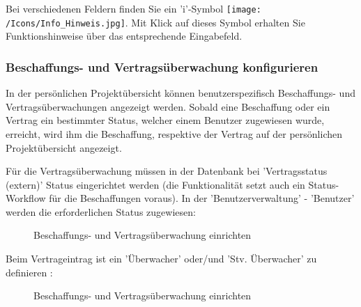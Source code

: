 Bei verschiedenen Feldern finden Sie ein 'i'-Symbol \texttt{[image: /Icons/Info\_Hinweis.jpg]}. Mit Klick auf dieses Symbol erhalten Sie Funktionshinweise über das entsprechende Eingabefeld.

\subsubsection{Beschaffungs- und Vertragsüberwachung konfigurieren}
\label{bkm:Ref20190318001}

In der persönlichen Projektübersicht können benutzerspezifisch Beschaffungs- und Vertragsüberwachungen angezeigt werden. Sobald eine Beschaffung oder ein Vertrag ein bestimmter Status, welcher einem Benutzer zugewiesen wurde, erreicht, wird ihm die Beschaffung, respektive der Vertrag auf der persönlichen Projektübersicht angezeigt.

\vspace{\baselineskip}

Für die Vertragsüberwachung müssen in der Datenbank bei 'Vertragsstatus (extern)' Status eingerichtet werden (die Funktionalität setzt auch ein Status-Workflow für die Beschaffungen voraus). In der 'Benutzerverwaltung' - 'Benutzer' werden die erforderlichen Status zugewiesen:

\begin{figure}[H]
\caption{Beschaffungs- und Vertragsüberwachung einrichten}
\end{figure}

Beim Vertrageintrag ist ein 'Überwacher' oder/und 'Stv. Überwacher' zu definieren :

\begin{figure}[H]
\caption{Beschaffungs- und Vertragsüberwachung einrichten}
\end{figure}

